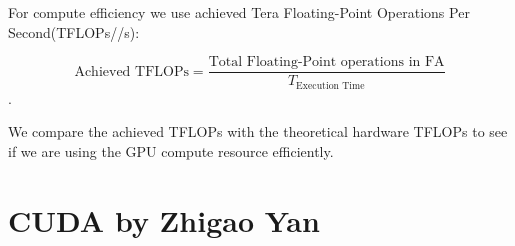 \documentclass[11pt]{article}
\begin{document}
For compute efficiency we use achieved Tera Floating-Point Operations Per Second(TFLOPs//s): 

$$\text{Achieved TFLOPs} = \frac{\text{Total Floating-Point operations in FA}}{T_{\text{Execution Time}}}$$.

We compare the achieved TFLOPs with the theoretical hardware TFLOPs to see if we are using the GPU compute resource efficiently.




 \begin{comment}
\begin{algorithm}[htbp]
  \caption{Standard Attention}
  \label{alg:standard_attention}
  \begin{algorithmic}[1]
    \STATE Load $Q$ and $K$ by blocks from HBM.
    \STATE Compute $S = (1/\sqrt{d})QK^T$ (GEMM-I).
    \STATE Write $S$ to HBM.
    \STATE Read $S$ from HBM.
    \STATE Compute $S = S - \text{rowmax}(S)$.
    \STATE Compute $P = \text{softmax}(S)$.
    \STATE Write $P$ to HBM.
    \STATE Load $P$ and $V$ by blocks from HBM.
    \STATE Compute $O = PV$ (GEMM-II).
    \STATE Write $O$ to HBM.
  \end{algorithmic}
\end{algorithm}
\end{comment}


\section{CUDA by Zhigao Yan}
\end{document}
